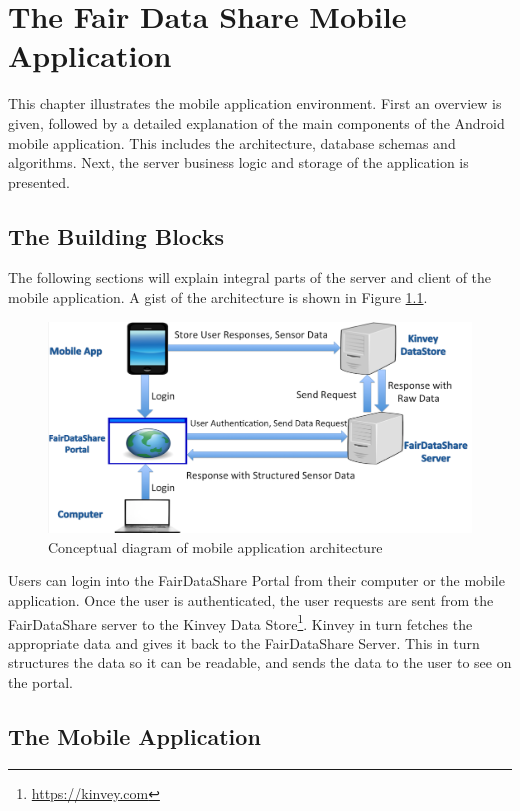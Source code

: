 \chapter{The Fair Data Share Mobile Application}
This chapter illustrates the mobile application environment. First an overview is given, followed by a detailed explanation of the main components of the Android mobile application. This includes the architecture, database schemas and algorithms. Next, the server business logic and storage of the application is presented.

\section{The Building Blocks}

The following sections will explain integral parts of the server and client of the mobile application. A gist of the architecture is shown
in Figure \ref{fig:bb}.

\begin{figure}[ht!]
\centering
\includegraphics[width=\textwidth,keepaspectratio]{./images/blocks_app}
\caption{Conceptual diagram of mobile application architecture}
\label{fig:bb}
\end{figure}

Users can login into the FairDataShare Portal from their computer or the mobile application. Once the user is authenticated, the user requests
are sent from the FairDataShare server to the Kinvey Data Store\footnote{\url{https://kinvey.com}}. Kinvey in turn fetches the appropriate data and gives it back to the FairDataShare Server. This in turn structures the data so it can be readable, and sends the data to the user to see on the portal.

\section{The Mobile Application}


